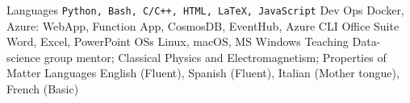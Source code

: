 

\begin{cvskills}
  \cvskill
    {Languages}
    {\texttt{Python, Bash, C/C++, HTML, LaTeX, JavaScript}}
  \cvskill
    {Dev Ops}
    {Docker, Azure: WebApp, Function App, CosmosDB, EventHub, Azure CLI}
  \cvskill
    {Office Suite}
    {Word, Excel, PowerPoint}
  \cvskill
    {OSs}
    {Linux, macOS, MS Windows}
  \cvskill
    {Teaching}
    {Data-science group mentor; Classical Physics and Electromagnetism; Properties of Matter}
  \cvskill
    {Languages}
    {English (Fluent), Spanish (Fluent), Italian (Mother tongue), French (Basic)}
\end{cvskills}
